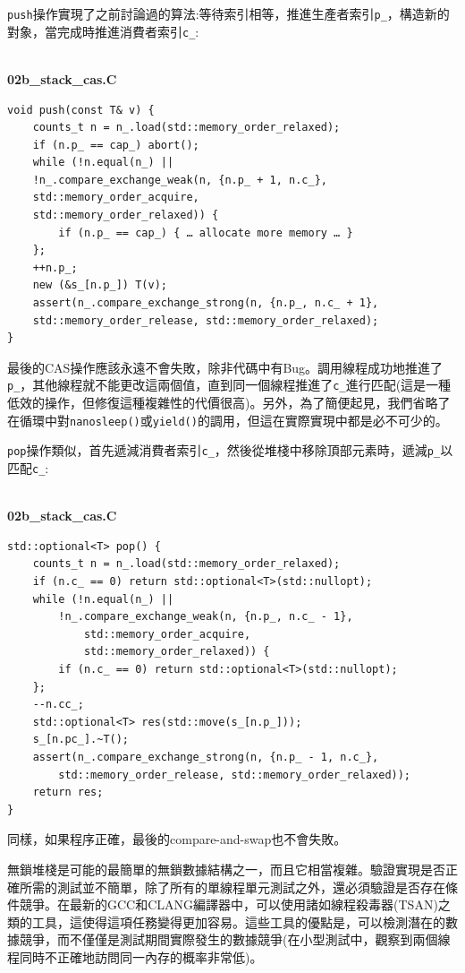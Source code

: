 \texttt{push}操作實現了之前討論過的算法:等待索引相等，推進生產者索引\texttt{p\_}，構造新的對象，當完成時推進消費者索引\texttt{c\_}:

\hspace*{\fill} \\ %
\noindent
\textbf{02b\_stack\_cas.C}
\begin{lstlisting}[style=styleCXX]
void push(const T& v) {
	counts_t n = n_.load(std::memory_order_relaxed);
	if (n.p_ == cap_) abort();
	while (!n.equal(n_) ||
	!n_.compare_exchange_weak(n, {n.p_ + 1, n.c_},
	std::memory_order_acquire,
	std::memory_order_relaxed)) {
		if (n.p_ == cap_) { … allocate more memory … }
	};
	++n.p_;
	new (&s_[n.p_]) T(v);
	assert(n_.compare_exchange_strong(n, {n.p_, n.c_ + 1},
	std::memory_order_release, std::memory_order_relaxed);
}
\end{lstlisting}

最後的CAS操作應該永遠不會失敗，除非代碼中有Bug。調用線程成功地推進了\texttt{p\_}，其他線程就不能更改這兩個值，直到同一個線程推進了\texttt{c\_}進行匹配(這是一種低效的操作，但修復這種複雜性的代價很高)。另外，為了簡便起見，我們省略了在循環中對\texttt{nanosleep()}或\texttt{yield()}的調用，但這在實際實現中都是必不可少的。

\texttt{pop}操作類似，首先遞減消費者索引\texttt{c\_}，然後從堆棧中移除頂部元素時，遞減\texttt{p\_}以匹配\texttt{c\_}:

\hspace*{\fill} \\ %
\noindent
\textbf{02b\_stack\_cas.C}
\begin{lstlisting}[style=styleCXX]
std::optional<T> pop() {
	counts_t n = n_.load(std::memory_order_relaxed);
	if (n.c_ == 0) return std::optional<T>(std::nullopt);
	while (!n.equal(n_) ||
		!n_.compare_exchange_weak(n, {n.p_, n.c_ - 1},
			std::memory_order_acquire,
			std::memory_order_relaxed)) {
		if (n.c_ == 0) return std::optional<T>(std::nullopt);
	};
	--n.cc_;
	std::optional<T> res(std::move(s_[n.p_]));
	s_[n.pc_].~T();
	assert(n_.compare_exchange_strong(n, {n.p_ - 1, n.c_},
		std::memory_order_release, std::memory_order_relaxed));
	return res;
}
\end{lstlisting}

同樣，如果程序正確，最後的compare-and-swap也不會失敗。

無鎖堆棧是可能的最簡單的無鎖數據結構之一，而且它相當複雜。驗證實現是否正確所需的測試並不簡單，除了所有的單線程單元測試之外，還必須驗證是否存在條件競爭。在最新的GCC和CLANG編譯器中，可以使用諸如線程殺毒器(TSAN)之類的工具，這使得這項任務變得更加容易。這些工具的優點是，可以檢測潛在的數據競爭，而不僅僅是測試期間實際發生的數據競爭(在小型測試中，觀察到兩個線程同時不正確地訪問同一內存的概率非常低)。

